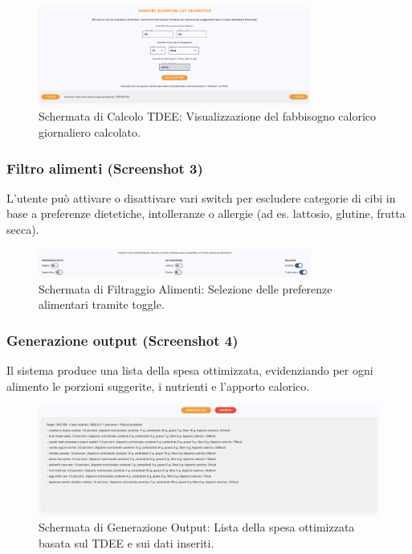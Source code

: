 \documentclass[11pt,a4paper]{article}
\begin{document}
\begin{figure}[h!]
    \centering
    \includegraphics[width=0.8\textwidth]{calcolo_tdee.png}
    \caption{Schermata di Calcolo TDEE: Visualizzazione del fabbisogno calorico giornaliero calcolato.}
    \label{fig:calcolo_tdee}
\end{figure}

\subsubsection{Filtro alimenti (Screenshot 3)}
L’utente può attivare o disattivare vari switch per escludere categorie di cibi in base a preferenze dietetiche, intolleranze o allergie (ad es. lattosio, glutine, frutta secca).

\begin{figure}[h!]
    \centering
    \includegraphics[width=0.8\textwidth]{filtro_alimenti.png}
    \caption{Schermata di Filtraggio Alimenti: Selezione delle preferenze alimentari tramite toggle.}
    \label{fig:filtro_alimenti}
\end{figure}

\subsubsection{Generazione output (Screenshot 4)}
Il sistema produce una lista della spesa ottimizzata, evidenziando per ogni alimento le porzioni suggerite, i nutrienti e l’apporto calorico.

\begin{figure}[h!]
    \centering
    \includegraphics[width=1\textwidth]{generazione_output.png}
    \caption{Schermata di Generazione Output: Lista della spesa ottimizzata basata sul TDEE e sui dati inseriti.}
    \label{fig:generazione_output}
\end{figure}
\end{document}

